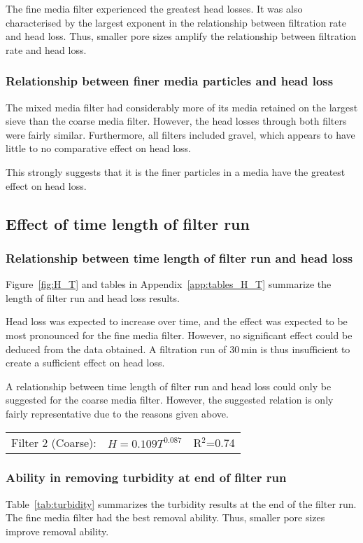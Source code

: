 \documentclass{article}
\begin{document}
The fine media filter experienced the greatest head losses. 
It was also characterised by the largest exponent in the relationship between
filtration rate and head loss.
Thus, smaller pore sizes amplify the relationship between filtration rate and 
head loss.

\subsubsection{Relationship between finer media particles and head loss}
The mixed media filter had considerably more of its media retained on the 
largest sieve than the coarse media filter.
However, the head losses through both filters were fairly similar.
Furthermore, all filters included gravel, which appears to have little to no
comparative effect on head loss.

This strongly suggests that it is the finer particles in a media have the 
greatest effect on head loss.


\subsection{Effect of time length of filter run}
\subsubsection{Relationship between time length of filter run and head loss}
Figure~\ref{fig:H_T} and tables in Appendix~\ref{app:tables_H_T} summarize the 
length of filter run and head loss results.

Head loss was expected to increase over time, and the effect was expected to
be most pronounced for the fine media filter. 
However, no significant effect could be deduced from the data obtained.
A filtration run of 30\,min is thus insufficient to create a sufficient effect
on head loss.

A relationship between time length of filter run and head loss could only be 
suggested for the coarse media filter.
However, the suggested relation is only fairly representative due to the 
reasons given above.
\begin{center}
\begin{tabular}{rll}
Filter 2 (Coarse): & $H=0.109T^{0.087}$ & R$^2$=0.74 \\
\end{tabular}
\end{center}

\subsubsection{Ability in removing turbidity at end of filter run}
Table~\ref{tab:turbidity} summarizes the turbidity results at the end of the 
filter run.
The fine media filter had the best removal ability. Thus, smaller pore sizes 
improve removal ability.
\end{document}
